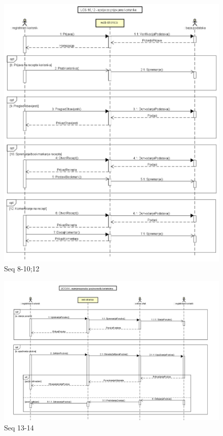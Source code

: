 				\begin{figure}[H]
					\centering
					\includegraphics[width=1.2\linewidth]{"slike/dijagrami/Seq 8-10,12"}
					\caption{Seq 8-10;12}
					\label{fig:seq-8-10;12}
				\end{figure}
				
				\begin{figure}[H]
					\centering
					\includegraphics[width=1.2\linewidth]{"slike/dijagrami/Seq 13-14"}
					\caption{Seq 13-14}
					\label{fig:seq-13-14}
				\end{figure}
				
